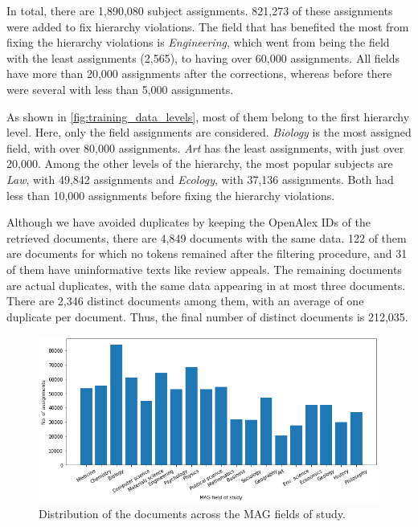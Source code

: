 In total, there are 1,890,080 subject assignments. 821,273 of these assignments were added to fix hierarchy violations. The field that has benefited the most from fixing the hierarchy violations is \textit{Engineering}, which went from being the field with the least assignments (2,565), to having over 60,000 assignments. All fields have more than 20,000 assignments after the corrections, whereas before there were several with less than 5,000 assignments.

As shown in \ref{fig:training_data_levels}, most of them belong to the first hierarchy level. Here, only the field assignments are considered. \textit{Biology} is the most assigned field, with over 80,000 assignments. \textit{Art} has the least assignments, with just over 20,000. Among the other levels of the hierarchy, the most popular subjects are \textit{Law}, with 49,842 assignments and \textit{Ecology}, with 37,136 assignments. Both had less than 10,000 assignments before fixing the hierarchy violations.

Although we have avoided duplicates by keeping the OpenAlex IDs of the retrieved documents, there are 4,849 documents with the same data. 122 of them are documents for which no tokens remained after the filtering procedure, and 31 of them have uninformative texts like review appeals. The remaining documents are actual duplicates, with the same data appearing in at most three documents. There are 2,346 distinct documents among them, with an average of one duplicate per document. Thus, the final number of distinct documents is 212,035.

\begin{figure}
    \centering
    \includegraphics[width=\textwidth]{figures/supervised_approach/training_data_fields.png}
    \caption{Distribution of the documents across the MAG fields of study.}
    \label{fig:training_data_fields}
\end{figure}